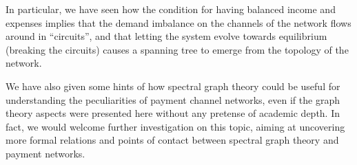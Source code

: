 \documentclass[a4paper]{article}
\begin{document}
In particular, we have seen how the condition for having balanced income and expenses implies that the demand imbalance on the channels of the network flows around in ``circuits'', and that letting the system evolve towards equilibrium (breaking the circuits) causes a spanning tree to emerge from the topology of the network.

We have also given some hints of how spectral graph theory could be useful for understanding the peculiarities of payment channel networks, even if the graph theory aspects were presented here without any pretense of academic depth. In fact, we would welcome further investigation on this topic, aiming at uncovering more formal relations and points of contact between spectral graph theory and payment networks.
\end{document}
